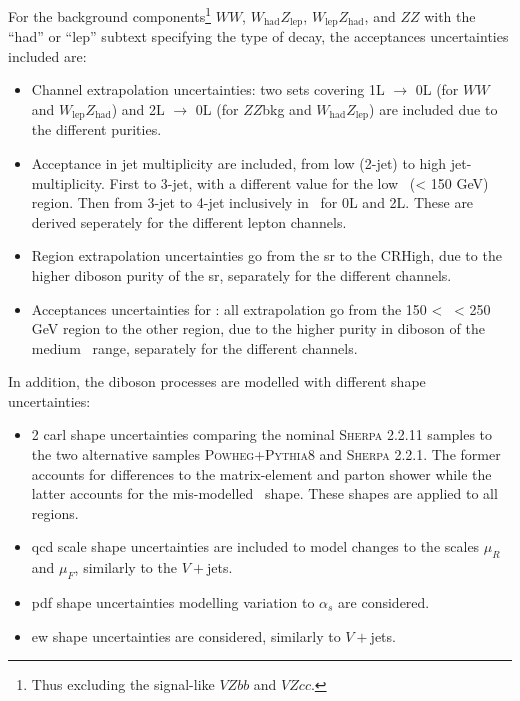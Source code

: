 For the background components\footnote{Thus excluding the signal-like $VZbb$ and $VZcc$.} $WW$, $W_{\text{had}}Z_{\text{lep}}$, $W_{\text{lep}}Z_{\text{had}}$, and $ZZ$ with the ``had'' or ``lep'' subtext specifying the type of decay, the acceptances uncertainties included are:
\begin{itemize}[leftmargin=*]
    \item Channel extrapolation uncertainties: two sets covering 1L $\rightarrow$ 0L (for $WW$ and $W_{\text{lep}}Z_{\text{had}}$) and 2L $\rightarrow$ 0L (for $ZZ$bkg and $W_{\text{had}}Z_{\text{lep}}$) are included due to the different purities.
    \item Acceptance in jet multiplicity are included, from low (2-jet) to high jet-multiplicity. First to 3-jet, with a different value for the low \ptv\ (< 150 GeV) region. Then from 3-jet to 4-jet inclusively in \ptv\ for 0L and 2L. These are derived seperately for the different lepton channels. %
    \item Region extrapolation uncertainties go from the \gls{sr} to the CRHigh, due to the higher diboson purity of the \gls{sr}, separately for the different channels.
    \item Acceptances uncertainties for \ptv: all extrapolation go from the 150 < \ptv\ < 250 GeV region to the other region, due to the higher purity in diboson of the medium \ptv\ range, separately for the different channels.
\end{itemize}

In addition, the diboson processes are modelled with different shape uncertainties:
\begin{itemize}
    \item 2 \gls{carl} shape uncertainties comparing the nominal \textsc{Sherpa} 2.2.11 samples to the two alternative samples \textsc{Powheg}+\textsc{Pythia}8 and \textsc{Sherpa} 2.2.1. The former accounts for differences to the matrix-element and parton shower while the latter accounts for the mis-modelled \ptv\ shape. These shapes are applied to all regions.
    \item \gls{qcd} scale shape uncertainties are included to model changes to the scales $\mu_R$ and $\mu_F$, similarly to the $V+$jets.
    \item \gls{pdf} shape uncertainties modelling variation to $\alpha_s$ are considered.
    \item \gls{ew} shape uncertainties are considered, similarly to $V+$jets.
\end{itemize}

